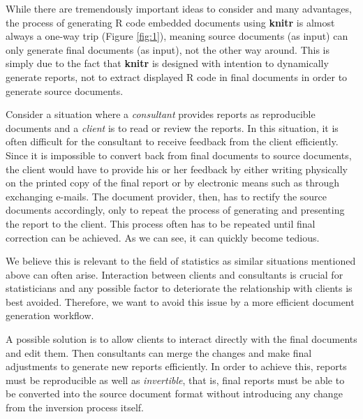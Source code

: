 \documentclass[a4paper, 12pt]{report}
\begin{document}
While there are tremendously important ideas to consider and many advantages, the process of generating R code embedded documents using \textbf{knitr} is almost always a one-way trip (Figure \ref{fig:1}), meaning source documents (as input) can only generate final documents (as input), not the other way around. This is simply due to the fact that \textbf{knitr} is designed with intention to dynamically generate reports, not to extract displayed R code in final documents in order to generate source documents.

Consider a situation where a \emph{consultant} provides reports as reproducible documents and a \emph{client} is to read or review the reports. In this situation, it is often difficult for the consultant to receive feedback from the client efficiently. Since it is impossible to convert back from final documents to source documents, the client would have to provide his or her feedback by either writing physically on the printed copy of the final report or by electronic means such as through exchanging e-mails. The document provider, then, has to rectify the source documents accordingly, only to repeat the process of generating and presenting the report to the client. This process often has to be repeated until final correction can be achieved. As we can see, it can quickly become tedious.

We believe this is relevant to the field of statistics as similar situations mentioned above can often arise. Interaction between clients and consultants is crucial for statisticians and any possible factor to deteriorate the relationship with clients is best avoided. Therefore, we want to avoid this issue by a more efficient document generation workflow.

A possible solution is to allow clients to interact directly with the final documents and edit them. Then consultants can merge the changes and make final adjustments to generate new reports efficiently. In order to achieve this, reports must be reproducible as well as \emph{invertible}, that is, final reports must be able to be converted into the source document format without introducing any change from the inversion process itself.
\end{document}

